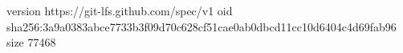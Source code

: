 version https://git-lfs.github.com/spec/v1
oid sha256:3a9a0383abce7733b3f09d70c628cf51cae0ab0dbcd11cc10d6404c4d69fab96
size 77468
